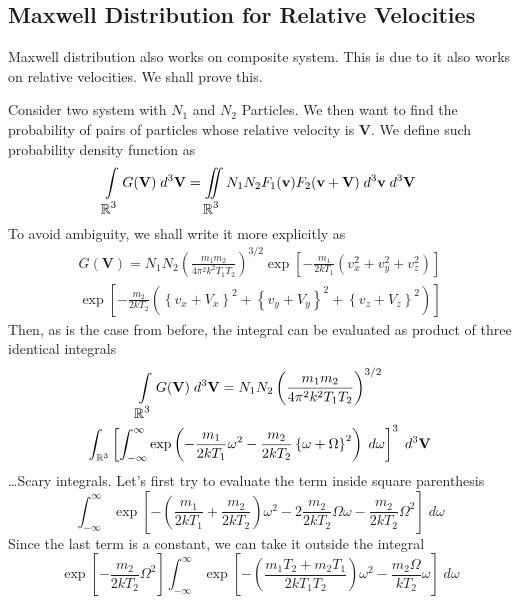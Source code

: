 \documentclass[../../../Main.tex]{subfiles}
\begin{document}
\subsection*{Maxwell Distribution for Relative Velocities}
Maxwell distribution also works on composite system. This is due to it also works on relative velocities. We shall prove this.

Consider two system with $N_1$ and $N_2$ Particles. We then want to find the probability of pairs of particles whose relative velocity is $\mathbf{V}$. We define such probability density function as 
\begin{equation*}
    \int\displaylimits_{\displaystyle\mathbb{R}^3} G(\mathbf{V}) \; d^3\mathbf{V} = \iint\displaylimits_{ \displaystyle \mathbb{R}^3} N_1 N_2 F_1(\mathbf{v}) F_2(\mathbf{v+V}) \; d^3\mathbf{v}\; d^3\mathbf{V}
\end{equation*}
To avoid ambiguity, we shall write it more explicitly as 
\begin{multline*}
    G(\mathbf{V}) = N_1 N_2 \left(\frac{m_1 m_2}{4\pi^2 k^2 T_1 T_2}\right)^{3/2} 
    \exp\left[-\frac{m_1}{2k T_1 }\left( v_x^2+v_y^2+v_z^2 \right)\right] \\
    \exp\left[-\frac{m_2}{2k T_2 }\left( \left\{v_x+V_x\right\}^2+ \left\{v_y+V_y\right\}^2 + \left\{v_z+V_z\right\}^2\right)\right] 
\end{multline*}
Then, as is the case from before, the integral can be evaluated as product of three identical integrals
\begin{multline*}
    \int\displaylimits_{\displaystyle\mathbb{R}^3} G(\mathbf{V}) \; d^3\mathbf{V} =N_1 N_2 \left(\frac{m_1 m_2}{4\pi^2 k^2 T_1 T_2}\right)^{3/2} \\
    \int_{\mathbb{R}^3}\left[  \int_{-\infty}^{\infty}\exp\left( -\frac{m_1}{2kT_1} \omega^2-\frac{m_2}{2kT_2}\left\{\omega + \Omega\right\}^2 \right)\;d\omega \right]^3\;d^3\mathbf{V}
\end{multline*}
\dots Scary integrals. Let's first try to evaluate the term inside square parenthesis
\begin{equation*}
    \int_{-\infty}^{\infty}\exp\left[-\left(\frac{m_1}{2kT_1} +\frac{m_2}{2kT_2} \right) \omega^2 -2\frac{m_2}{2kT_2}\Omega\omega -\frac{m_2}{2kT_2}\Omega^2\right] \;d\omega 
\end{equation*}
Since the last term is a constant, we can take it outside the integral
\begin{equation*}
    \exp\left[-\frac{m_2}{2kT_2}\Omega^2\right]\int_{-\infty}^{\infty}\exp\left[-\left(\frac{m_1T_2+ m_2T_1}{2kT_1T_2} \right) \omega^2 -\frac{m_2\Omega}{kT_2}\omega \right] \;d\omega 
\end{equation*}
\end{document}
